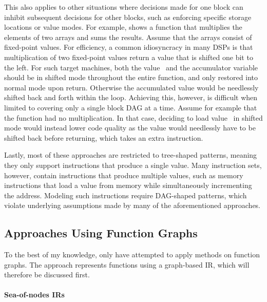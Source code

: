 This also applies to other situations where decisions made for one \gls{block}
can inhibit subsequent decisions for other \glspl{block}, such as enforcing
specific storage locations or value modes.
%
For example,  shows a \gls{function} that
multiplies the elements of two arrays and sums the results.
%
Assume that the arrays consist of fixed-point values.
%
For efficiency, a common idiosyncracy in many \glspl{DSP} is that multiplication
of two fixed-point values return a value that is shifted one bit to the left.
%
For such \glspl{target machine}, both the value~ and the accumulator
\gls{variable}~ should be in shifted mode throughout the entire
\gls{function}, and only restored into normal mode upon return.
%
Otherwise the accumulated value would be needlessly shifted back and forth
within the loop.
%
Achieving this, however, is difficult when limited to covering only a single
\gls{block DAG} at a time.
%
Assume for example that the function had no multiplication.
%
In that case, deciding to load value~ in shifted mode would instead
lower code quality as the value would needlessly have to be shifted back before
returning, which takes an extra \gls{instruction}.

Lastly, most of these approaches are restricted to tree-shaped \glspl{pattern},
meaning they only support \glspl{instruction} that produce a single value.
%
Many \glspl{instruction set}, however, contain \glspl{instruction} that produce
multiple values, such as memory \glspl{instruction} that load a value from
memory while simultaneously incrementing the address.
%
Modeling such \glspl{instruction} require \gls{DAG}-shaped \glspl{pattern},
which violate underlying assumptions made by many of the aforementioned
approaches.



\subsection{Approaches Using Function Graphs}

To the best of my knowledge, only \textcite{PalecznyEtAl:2001} have attempted to
apply  methods on \glspl{function graph}.
%
The approach represents \glspl{function} using a graph-based \gls{IR}, which
will therefore be discussed first.



\paragraph{Sea-of-nodes IRs}


